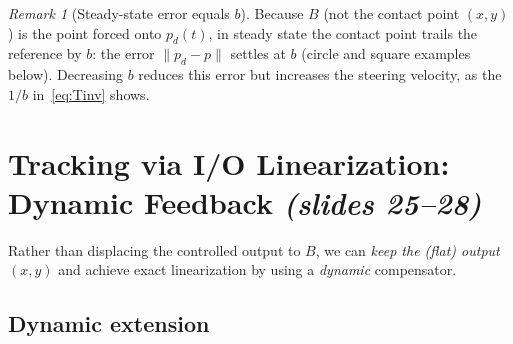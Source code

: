 \documentclass[11pt,a4paper]{article}
\def\bm#1{#1}%
\def\vect#1{#1}%
\newcommand{\vect}[1]{\bm{#1}}
\newcommand{\pd}{\vect{p}_d}
\theoremstyle{definition}
\theoremstyle{plain}
\theoremstyle{remark}
\newtheorem*{remark}{Remark}
\begin{document}
\begin{remark}[Steady-state error equals $b$]
Because $B$ (not the contact point $(x,y)$) is the point forced onto $\pd(t)$, in steady state the contact point trails the reference by $b$: the error $\|\pd-\vect p\|$ settles at $b$ (circle and square examples below). Decreasing $b$ reduces this error but increases the steering velocity, as the $1/b$ in~\eqref{eq:Tinv} shows.
\end{remark}

\section{Tracking via I/O Linearization: Dynamic Feedback \texorpdfstring{\emph{(slides 25--28)}}{(slides 25--28)}}

Rather than displacing the controlled output to $B$, we can \emph{keep the (flat) output $(x,y)$} and achieve exact linearization by using a \emph{dynamic} compensator.

\subsection{Dynamic extension}
\end{document}
